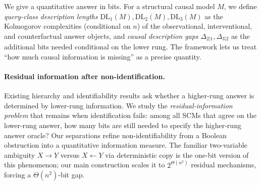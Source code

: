\documentclass{article}
\theoremstyle{plain}
\theoremstyle{definition}
\newcommand{\DL}{\mathrm{DL}}
\begin{document}
We give a quantitative answer in bits. For a structural causal model $M$, we define \emph{query-class description lengths} $\DL_1(M), \DL_2(M), \DL_3(M)$ as the Kolmogorov complexities (conditional on $n$) of the observational, interventional, and counterfactual answer objects, and \emph{causal description gaps} $\Delta_{2|1}, \Delta_{3|2}$ as the additional bits needed conditional on the lower rung. The framework lets us treat ``how much causal information is missing'' as a precise quantity.

\paragraph{Residual information after non-identification.}
Existing hierarchy and identifiability results ask whether a higher-rung answer is determined by lower-rung information. We study the \emph{residual-information problem} that remains when identification fails: among all SCMs that agree on the lower-rung answer, how many bits are still needed to specify the higher-rung answer oracle? Our separations refine non-identifiability from a Boolean obstruction into a quantitative information measure. The familiar two-variable ambiguity $X \to Y$ versus $X \leftarrow Y$ via deterministic copy is the one-bit version of this phenomenon; our main construction scales it to $2^{\Theta(n^2)}$ residual mechanisms, forcing a $\Theta(n^2)$-bit gap.
\end{document}
